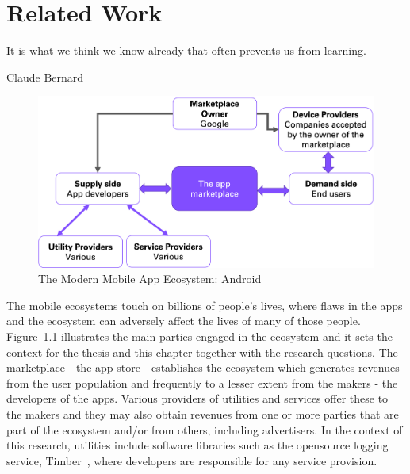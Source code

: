 \setchapterpreamble[u]{\margintoc}
\chapter{Related Work}
\label{chapter-related-work}
\epigraph{It is what we think we know already that often prevents us from learning.}{Claude Bernard} %


\begin{figure}[b!]
    \centering
    \includegraphics[width=0.9\linewidth]{images/my/android-app-ecosystem-main-players.png}
    \caption{The Modern Mobile App Ecosystem: Android}
    \label{fig:my_modern-mobile-app-ecosystem}
\end{figure}

The mobile ecosystems touch on billions of people's lives, where flaws in the apps and the ecosystem can adversely affect the lives of many of those people. Figure~\ref{fig:my_modern-mobile-app-ecosystem} illustrates the main parties engaged in the ecosystem %
and it sets the context for the thesis and this chapter together with the research questions. The marketplace - the app store - establishes the ecosystem which generates revenues from the user population and frequently to a lesser extent from the makers -  the developers of the apps. Various providers of utilities and services offer these to the makers and they may also obtain revenues from one or more parties that are part of the ecosystem and/or from others, including advertisers. In the context of this research, utilities include software libraries such as the opensource logging service, Timber~, where developers are responsible for any service provision. 


